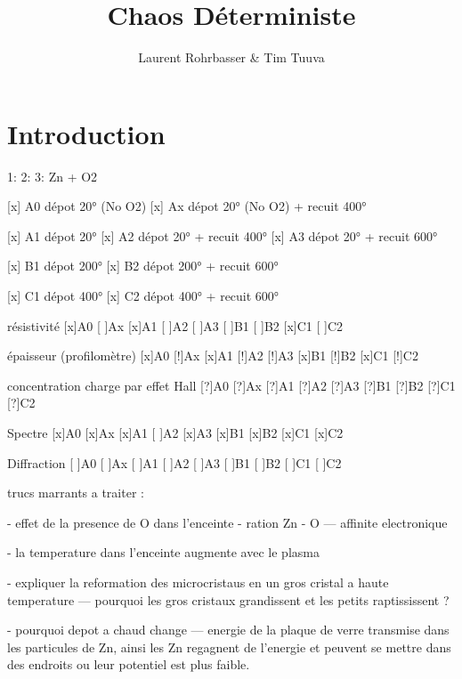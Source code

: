 \documentclass[a4paper,12pt,oneside]{article}
\begin{document}
\title{Chaos Déterministe}
\author{Laurent Rohrbasser \& Tim Tuuva}

\maketitle
\tableofcontents
\baselineskip=16pt
\parindent=15pt
\parskip=5pt

\begin{abstract}
\end{abstract}

\section{Introduction}




1:
2:
3: Zn + O2






[x] A0 dépot 20° (No O2)
[x] Ax dépot 20° (No O2) + recuit 400°

[x] A1 dépot 20°
[x] A2 dépot 20° + recuit 400°
[x] A3 dépot 20° + recuit 600°

[x] B1 dépot 200°
[x] B2 dépot 200° + recuit 600°

[x] C1 dépot 400°
[x] C2 dépot 400° + recuit 600°



résistivité
[x]A0
[ ]Ax
[x]A1
[ ]A2
[ ]A3
[ ]B1
[ ]B2
[x]C1
[ ]C2

épaisseur (profilomètre)
[x]A0
[!]Ax
[x]A1
[!]A2
[!]A3
[x]B1
[!]B2
[x]C1
[!]C2

concentration charge par effet Hall
[?]A0
[?]Ax
[?]A1
[?]A2
[?]A3
[?]B1
[?]B2
[?]C1
[?]C2

Spectre
[x]A0
[x]Ax
[x]A1
[ ]A2
[x]A3
[x]B1
[x]B2
[x]C1
[x]C2

Diffraction 
[ ]A0
[ ]Ax
[ ]A1
[ ]A2
[ ]A3
[ ]B1
[ ]B2
[ ]C1
[ ]C2


trucs marrants a traiter :

- effet de la presence de O dans l'enceinte
- ration Zn - O 
--- affinite electronique


- la temperature dans l'enceinte augmente avec le plasma

- expliquer la reformation des microcristaus en un gros cristal a haute temperature
--- pourquoi les gros cristaux grandissent et les petits raptississent ?

- pourquoi depot a chaud change
--- energie de la plaque de verre transmise dans les particules de Zn, ainsi les Zn regagnent de l'energie et peuvent se mettre dans des endroits ou leur potentiel est plus faible.
\end{document}
